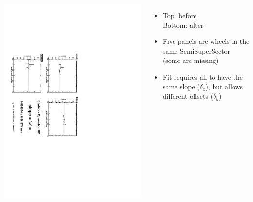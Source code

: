 \documentclass[compress]{beamer}
\begin{document}
\begin{frame}
\begin{columns}
\vfill
\includegraphics[height=\linewidth, angle=90]{zfits_after/zfit_2_02.pdf}
\begin{itemize}
\item Top: before \\ Bottom: after
\item Five panels are wheels in the same SemiSuperSector (some are missing)
\item Fit requires all to have the same slope ($\delta_z$), but allows different offsets ($\delta_y$)
\end{itemize}
\end{columns}
\end{frame}
\end{document}
